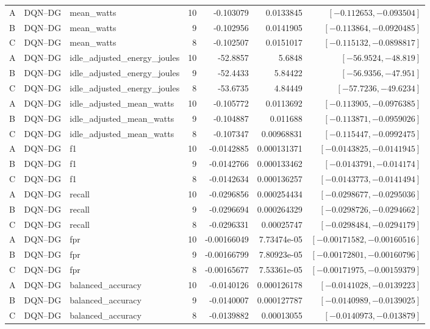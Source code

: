 \begin{longtable}{lllrrrr}
A & DQN--DG & mean\_watts & 10 & -0.103079 & 0.0133845 & $[-0.112653,-0.093504]$\\
B & DQN--DG & mean\_watts & 9 & -0.102956 & 0.0141905 & $[-0.113864,-0.0920485]$\\
C & DQN--DG & mean\_watts & 8 & -0.102507 & 0.0151017 & $[-0.115132,-0.0898817]$\\
A & DQN--DG & idle\_adjusted\_energy\_joules & 10 & -52.8857 & 5.6848 & $[-56.9524,-48.819]$\\
B & DQN--DG & idle\_adjusted\_energy\_joules & 9 & -52.4433 & 5.84422 & $[-56.9356,-47.951]$\\
C & DQN--DG & idle\_adjusted\_energy\_joules & 8 & -53.6735 & 4.84449 & $[-57.7236,-49.6234]$\\
A & DQN--DG & idle\_adjusted\_mean\_watts & 10 & -0.105772 & 0.0113692 & $[-0.113905,-0.0976385]$\\
B & DQN--DG & idle\_adjusted\_mean\_watts & 9 & -0.104887 & 0.011688 & $[-0.113871,-0.0959026]$\\
C & DQN--DG & idle\_adjusted\_mean\_watts & 8 & -0.107347 & 0.00968831 & $[-0.115447,-0.0992475]$\\
A & DQN--DG & f1 & 10 & -0.0142885 & 0.000131371 & $[-0.0143825,-0.0141945]$\\
B & DQN--DG & f1 & 9 & -0.0142766 & 0.000133462 & $[-0.0143791,-0.014174]$\\
C & DQN--DG & f1 & 8 & -0.0142634 & 0.000136257 & $[-0.0143773,-0.0141494]$\\
A & DQN--DG & recall & 10 & -0.0296856 & 0.000254434 & $[-0.0298677,-0.0295036]$\\
B & DQN--DG & recall & 9 & -0.0296694 & 0.000264329 & $[-0.0298726,-0.0294662]$\\
C & DQN--DG & recall & 8 & -0.0296331 & 0.00025747 & $[-0.0298484,-0.0294179]$\\
A & DQN--DG & fpr & 10 & -0.00166049 & 7.73474e-05 & $[-0.00171582,-0.00160516]$\\
B & DQN--DG & fpr & 9 & -0.00166799 & 7.80923e-05 & $[-0.00172801,-0.00160796]$\\
C & DQN--DG & fpr & 8 & -0.00165677 & 7.53361e-05 & $[-0.00171975,-0.00159379]$\\
A & DQN--DG & balanced\_accuracy & 10 & -0.0140126 & 0.000126178 & $[-0.0141028,-0.0139223]$\\
B & DQN--DG & balanced\_accuracy & 9 & -0.0140007 & 0.000127787 & $[-0.0140989,-0.0139025]$\\
C & DQN--DG & balanced\_accuracy & 8 & -0.0139882 & 0.00013055 & $[-0.0140973,-0.013879]$\\

\end{longtable}
